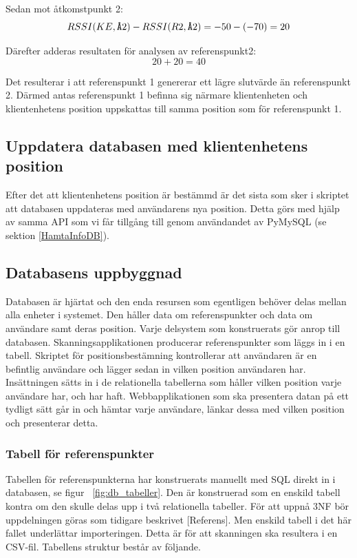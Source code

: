 \documentclass[swedish, a4paper,12pt]{article}
\begin{document}
Sedan mot åtkomstpunkt 2: $$ RSSI (KE,\verb|Å|2)  -  RSSI (R2,\verb|Å|2) = -50 - (- 70) = 20 $$

Därefter adderas resultaten för analysen av referenspunkt2: $$ 20 + 20 = 40$$

Det resulterar i att referenspunkt 1 genererar ett lägre slutvärde än referenspunkt 2. Därmed antas referenspunkt 1 befinna sig närmare klientenheten och klientenhetens position uppskattas till samma position som för referenspunkt 1.

\subsection{Uppdatera databasen med klientenhetens position}
Efter det att klientenhetens position är bestämmd är det sista som sker i skriptet att databasen uppdateras med användarens nya position. Detta görs med hjälp av samma API som vi får tillgång till genom användandet av PyMySQL (se sektion \ref{HamtaInfoDB}).

\subsection{Databasens uppbyggnad}\label{databasen}
Databasen är hjärtat och den enda resursen som egentligen behöver delas mellan alla enheter i systemet. Den håller data om referenspunkter och data om användare samt deras position. Varje delsystem som konstruerats gör anrop till databasen. Skanningsapplikationen producerar referenspunkter som läggs in i en tabell. Skriptet för positionsbestämning kontrollerar att användaren är en befintlig användare och lägger sedan in vilken position användaren har. Insättningen sätts in i de relationella tabellerna som håller vilken position varje användare har, och har haft. Webbapplikationen som ska presentera datan på ett tydligt sätt går in och hämtar varje användare, länkar dessa med vilken position och presenterar detta.

\subsubsection{Tabell för referenspunkter}
Tabellen för referenspunkterna har konstruerats manuellt med SQL direkt in i databasen, se figur ~\ref{fig:db_tabeller}.
Den är konstruerad som en enskild tabell kontra om den skulle delas upp i två relationella tabeller. För att uppnå 3NF bör uppdelningen göras som tidigare beskrivet [Referens]. Men enskild tabell i det här fallet underlättar importeringen. %
Detta är för att skanningen ska resultera i en CSV-fil. Tabellens struktur består av följande.
\end{document}
